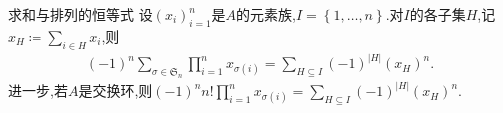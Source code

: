 \begin{proposition}{求和与排列的恒等式}{}
	设$\left(x_{i}\right)_{i=1}^{n}$是$A$的元素族,$I=\left\{1,\ldots,n\right\}$.对$I$的各子集$H$,记$x_{H}\coloneq\sum\limits_{i\in H}x_{i}$,则
	\begin{align*}
		\left(-1\right)^{n}\sum\limits_{\sigma\in\mathfrak{S}_{n}}\prod\limits_{i=1}^{n}x_{\sigma\left(i\right)}=\sum\limits_{H\subseteq I}\left(-1\right)^{\left|H\right|}\left(x_{H}\right)^{n}.
	\end{align*}
	进一步,若$A$是交换环,则$\left(-1\right)^{n}n!\prod\limits_{i=1}^{n}x_{\sigma\left(i\right)}=\sum\limits_{H\subseteq I}\left(-1\right)^{\left|H\right|}\left(x_{H}\right)^{n}.$
\end{proposition}

